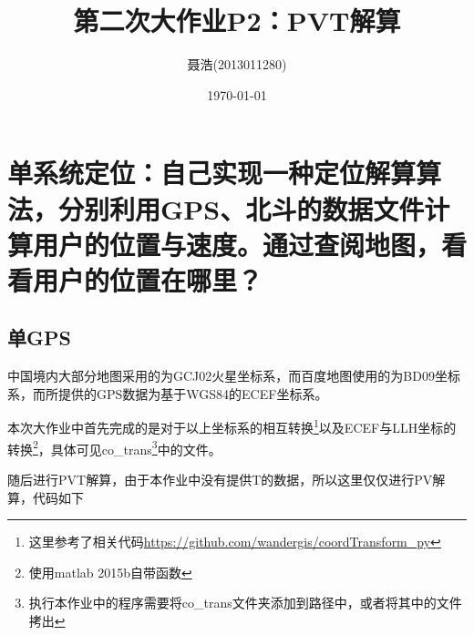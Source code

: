
\title{第二次大作业P2：PVT解算}
\author{聂浩(2013011280)}
\date{\today}

\maketitle
\section{单系统定位：自己实现一种定位解算算法，分别利用GPS、北斗的数据文件计算用户的位置与速度。通过查阅地图，看看用户的位置在哪里？}

    \subsection{单GPS}
    中国境内大部分地图采用的为GCJ02火星坐标系，而百度地图使用的为BD09坐标系，而所提供的GPS数据为基于WGS84的ECEF坐标系。

    本次大作业中首先完成的是对于以上坐标系的相互转换\footnote{这里参考了相关代码\url{https://github.com/wandergis/coordTransform_py}}以及ECEF与LLH坐标的转换\footnote{使用matlab 2015b自带函数}，具体可见co\_trans\footnote{执行本作业中的程序需要将co\_trans文件夹添加到路径中，或者将其中的文件拷出}中的文件。

    随后进行PVT解算，由于本作业中没有提供T的数据，所以这里仅仅进行PV解算，代码如下
    
    

